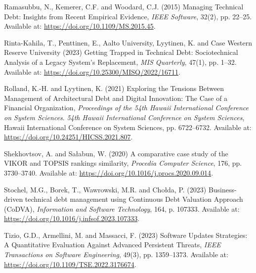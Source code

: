 \documentclass[
  12pt,
  letterpaper,
  12pt,
  oneside,
  english,
  onehalfspacing,
  headsepline]{MastersDoctoralThesis}
\newlength{\cslhangindent}
\newenvironment{CSLReferences}[2] %
 {\begin{list}{}{%
  \setlength{\itemindent}{0pt}
  \setlength{\leftmargin}{0pt}
  \setlength{\parsep}{0pt}
  \ifodd #1
   \setlength{\leftmargin}{\cslhangindent}
   \setlength{\itemindent}{-1\cslhangindent}
  \fi
  \setlength{\itemsep}{#2\baselineskip}}}
 {\end{list}}
\begin{document}
\begin{CSLReferences}{0}{1}
Ramasubbu, N., Kemerer, C.F. and Woodard, C.J. (2015)
\textquotesingle Managing {Technical Debt}: {Insights} from {Recent
Empirical Evidence}\textquotesingle, \emph{IEEE Software}, 32(2), pp.
22--25. Available at: \url{https://doi.org/10.1109/MS.2015.45}.

Rinta-Kahila, T., Penttinen, E., Aalto University, Lyytinen, K. and Case
Western Reserve University (2023) \textquotesingle Getting {Trapped} in
{Technical Debt}: {Sociotechnical Analysis} of a {Legacy System}'s
{Replacement}\textquotesingle, \emph{MIS Quarterly}, 47(1), pp. 1--32.
Available at: \url{https://doi.org/10.25300/MISQ/2022/16711}.

Rolland, K.-H. and Lyytinen, K. (2021) \textquotesingle Exploring the
{Tensions Between Management} of {Architectural Debt} and {Digital
Innovation}: {The Case} of a {Financial Organization}\textquotesingle,
\emph{Proceedings of the 54th {Hawaii International Conference} on
{System Sciences}}. \emph{54th {Hawaii International Conference} on
{System Sciences}}, Hawaii International Conference on System Sciences,
pp. 6722--6732. Available at:
\url{https://doi.org/10.24251/HICSS.2021.807}.

Shekhovtsov, A. and Sałabun, W. (2020) \textquotesingle A comparative
case study of the {VIKOR} and {TOPSIS} rankings
similarity\textquotesingle, \emph{Procedia Computer Science}, 176, pp.
3730--3740. Available at:
\url{https://doi.org/10.1016/j.procs.2020.09.014}.

Stochel, M.G., Borek, T., Wawrowski, M.R. and Chołda, P. (2023)
\textquotesingle Business-driven technical debt management using
{Continuous Debt Valuation Approach} ({CoDVA})\textquotesingle,
\emph{Information and Software Technology}, 164, p. 107333. Available
at: \url{https://doi.org/10.1016/j.infsof.2023.107333}.

Tizio, G.D., Armellini, M. and Massacci, F. (2023)
\textquotesingle Software {Updates Strategies}: {A Quantitative
Evaluation Against Advanced Persistent Threats}\textquotesingle,
\emph{IEEE Transactions on Software Engineering}, 49(3), pp. 1359--1373.
Available at: \url{https://doi.org/10.1109/TSE.2022.3176674}.


\end{CSLReferences}
\end{document}
